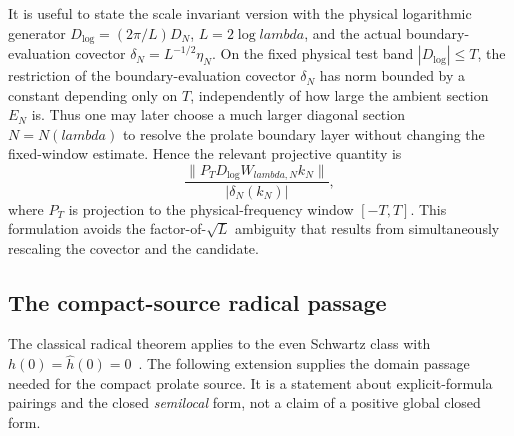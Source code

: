 \documentclass[11pt]{article}
\def\lambda{lambda}%
\theoremstyle{remark}
\begin{document}
It is useful to state the scale invariant version with the physical logarithmic generator $D_{\log}=(2\pi/L)D_N$, $L=2\log\lambda$, and the actual boundary-evaluation covector $\delta_N=L^{-1/2}\eta_N$.  On the fixed physical test band $|D_{\log}|\le T$, the restriction of the boundary-evaluation covector $\delta_N$ has norm bounded by a constant depending only on $T$, independently of how large the ambient section $E_N$ is.  Thus one may later choose a much larger diagonal section $N=N(\lambda)$ to resolve the prolate boundary layer without changing the fixed-window estimate.  Hence the relevant projective quantity is
\begin{equation}\label{eq:physical-projective-residual}
 \frac{\|P_TD_{\log}W_{\lambda,N}k_N\|}
 {|\delta_N(k_N)|},
\end{equation}
where $P_T$ is projection to the physical-frequency window $[-T,T]$.  This formulation avoids the factor-of-$\sqrt L$ ambiguity that results from simultaneously rescaling the covector and the candidate.

\subsection{The compact-source radical passage}
The classical radical theorem applies to the even Schwartz class with
$h(0)=\widehat h(0)=0$~\cite[Section 3]{ConnesConsani2023}.
The following extension supplies the domain passage needed for the compact
prolate source. It is a statement about explicit-formula pairings and the
closed \emph{semilocal} form, not a claim of a positive global closed form.
\end{document}
